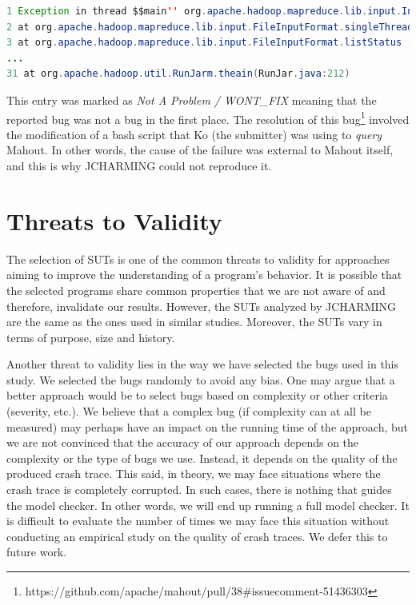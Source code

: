 \documentclass[12pt]{report}
\begin{document}
\begin{lstlisting}[language=Java]
1 Exception in thread $$main'' org.apache.hadoop.mapreduce.lib.input.InvalidInputException: Input path does not exist: /tmp/mahout-work-hoseog.lee/movielens/ratings.csv 
2 at org.apache.hadoop.mapreduce.lib.input.FileInputFormat.singleThreadedListStatus ... 
3 at org.apache.hadoop.mapreduce.lib.input.FileInputFormat.listStatus ... 
... 
31 at org.apache.hadoop.util.RunJarm.theain(RunJar.java:212)
\end{lstlisting}

This entry was marked as \emph{Not A Problem / WONT\_FIX} meaning that
the reported bug was not a bug in the first place. The resolution of
this
bug\footnote{https://github.com/apache/mahout/pull/38\#issuecomment-51436303}
involved the modification of a bash script that Ko (the submitter) was
using to \emph{query} Mahout. In other words, the cause of the failure
was external to Mahout itself, and this is why JCHARMING could not
reproduce it.

\section{\texorpdfstring{Threats to
Validity\label{sec:threats}}{Threats to Validity}}\label{threats-to-validity-4}

The selection of SUTs is one of the common threats to validity for
approaches aiming to improve the understanding of a program's behavior.
It is possible that the selected programs share common properties that
we are not aware of and therefore, invalidate our results. However, the
SUTs analyzed by JCHARMING are the same as the ones used in similar
studies. Moreover, the SUTs vary in terms of purpose, size and history.

Another threat to validity lies in the way we have selected the bugs
used in this study. We selected the bugs randomly to avoid any bias. One
may argue that a better approach would be to select bugs based on
complexity or other criteria (severity, etc.). We believe that a complex
bug (if complexity can at all be measured) may perhaps have an impact on
the running time of the approach, but we are not convinced that the
accuracy of our approach depends on the complexity or the type of bugs
we use. Instead, it depends on the quality of the produced crash trace.
This said, in theory, we may face situations where the crash trace is
completely corrupted. In such cases, there is nothing that guides the
model checker. In other words, we will end up running a full model
checker. It is difficult to evaluate the number of times we may face
this situation without conducting an empirical study on the quality of
crash traces. We defer this to future work.
\end{document}
